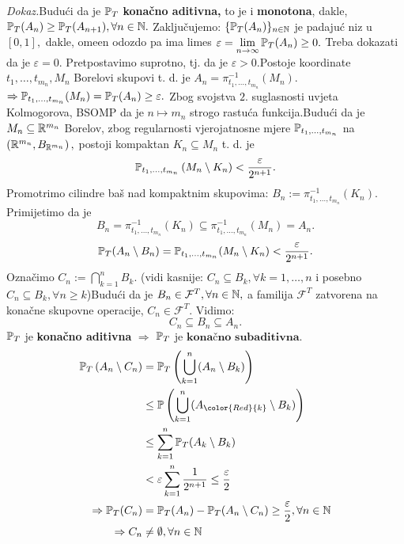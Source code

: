 \documentclass{article}
\begin{document}
\textit{Dokaz.}\newline Budući da je \(\Bbb P_T\) \textbf{konačno aditivna,} to je i \textbf{monotona}, dakle, \(\Bbb P_T(A_n)\ge\Bbb P_T(A_{n+1}),\forall n\in\Bbb N.\) Zaključujemo: \(\{\Bbb P_T(A_n)\}_{n\in\Bbb N}\) je padajuć niz u \([0,1],\) dakle, ome\dj{}en odozdo pa ima limes \(\varepsilon=\lim\limits_{n\to\infty}\Bbb P_T(A_n)\ge 0.\) Treba dokazati da je \(\varepsilon=0.\) Pretpostavimo suprotno, tj. da je \(\varepsilon>0.\)\newline Postoje koordinate \(t_1,\ldots,t_{m_n}, M_n\) Borelovi skupovi t. d. je \(\boxed{A_n=\pi_{t_1,\ldots,t_{m_n}}^{-1}(M_n)}.\)\newline \(\Rightarrow\Bbb P_{t_1,\ldots,t_{m_n}}(M_n)=\Bbb P_T(A_n)\ge\varepsilon.\) Zbog svojstva \(2.\) suglasnosti uvjeta Kolmogorova, BSOMP da je \(n\mapsto m_n\) strogo rastuća funkcija.\newline Budući da je \(M_n\subseteq\Bbb R^{m_n}\) Borelov, zbog regularnosti vjerojatnosne mjere \(\Bbb P_{t_1,\ldots,t_{m_n}}\) na \(\left(\Bbb R^{m_n},B_{\Bbb R^{m_n}}\right),\) postoji kompaktan \(K_n\subseteq M_n\) t. d. je \[\Bbb P_{t_1,\ldots,t_{m_n}}\left(M_n\setminus K_n\right)<\frac\varepsilon{2^{n+1}}.\] Promotrimo cilindre baš nad kompaktnim skupovima: \(\boxed{B_n:=\pi_{t_1,\ldots,t_{m_n}}^{-1}(K_n)}.\) Primijetimo da je \[\boxed{B_n}=\pi_{t_1,\ldots,t_{m_n}}^{-1}(K_n)\boxed{\subseteq} \pi_{t_1,\ldots,t_{m_n}}^{-1}(M_n)=\boxed{A_n}.\] \[\Bbb P_T(A_n\setminus B_n)=\Bbb P_{t_1,\ldots,t_{m_n}}(M_n\setminus K_n)<\frac\varepsilon{2^{n+1}}.\] Označimo \(C_n:=\bigcap_{k=1}^nB_k.\) (vidi kasnije: \(C_n\subseteq B_k,\forall k=1,\ldots,n\) i posebno \(C_n\subseteq B_k,\forall n\ge k\))\newline Budući da je \(B_n\in\mathcal F^T,\forall n\in\Bbb N,\) a familija \(\mathcal F^T\) zatvorena na konačne skupovne operacije, \(C_n\in\mathcal F^T.\) Vidimo: \[C_n\subseteq B_n\subseteq A_n.\] \(\Bbb P_T\) je \textbf{konačno aditivna} \(\Rightarrow\) \(\Bbb P_T\) je \(\textbf{konačno subaditivna}.\) \[\begin{aligned}\Bbb P_T\left(A_n\setminus C_n\right)&=\Bbb P_T\left(\bigcup_{k=1}^n(A_n\setminus B_k)\right)\\&\le\Bbb P\left(\bigcup_{k=1}^n(A_{\color{Red}{k}}\setminus B_k)\right)\\&\le\sum_{k=1}^n\Bbb P_T(A_k\setminus B_k)\\&<\varepsilon\sum_{k=1}^n\frac1{2^{n+1}}\le\frac\varepsilon2\\\Rightarrow\Bbb P_T(C_n)&=\Bbb P_T(A_n)-\Bbb P_T(A_n\setminus C_n)\ge\frac\varepsilon2,\forall n\in\Bbb N\\\Rightarrow C_n&\ne\emptyset,\forall n\in\Bbb N\end{aligned}\]
\end{document}
